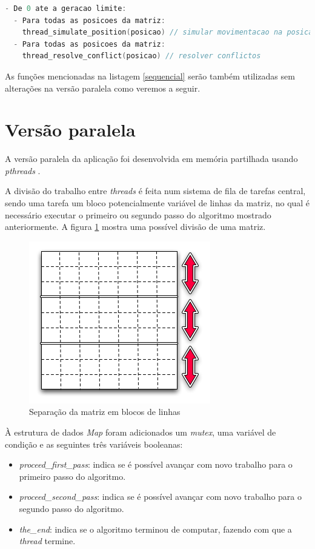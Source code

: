 \documentclass[12pt]{article}
\begin{document}
\begin{lstlisting}[language=c,frame=single,basicstyle=\footnotesize,caption={Algoritmo da versão sequencial.},label=sequencial]
- De 0 ate a geracao limite:
  - Para todas as posicoes da matriz:
    thread_simulate_position(posicao) // simular movimentacao na posicao
  - Para todas as posicoes da matriz:
    thread_resolve_conflict(posicao) // resolver conflictos
\end{lstlisting}

As funções mencionadas na listagem \ref{sequencial} serão também utilizadas sem alterações na versão
paralela como veremos a seguir.

\section{Versão paralela}

A versão paralela da aplicação foi desenvolvida em memória partilhada usando \textit{pthreads} \cite{pthreads}.

A divisão do trabalho entre \textit{threads} é feita num sistema de fila de tarefas central, sendo
uma tarefa um bloco potencialmente variável de linhas da matriz, no qual é necessário executar o primeiro
ou segundo passo do algoritmo mostrado anteriormente. A figura \ref{fig:tasks_matriz}
mostra uma possível divisão de uma matriz.

\begin{figure}[ht]
  \centering
    \includegraphics[scale=0.8]{diagrama_pipeline.png}
  \caption{Separação da matriz em blocos de linhas}
  \label{fig:tasks_matriz}
\end{figure}

À estrutura de dados \textit{Map} foram adicionados um \textit{mutex}, uma variável de condição
e as seguintes três variáveis booleanas:

\begin{itemize}
  \item \textit{proceed\_first\_pass}: indica se é possível avançar com novo trabalho
  para o primeiro passo do algoritmo.
  \item \textit{proceed\_second\_pass}: indica se é possível avançar com novo trabalho
  para o segundo passo do algoritmo.
  \item \textit{the\_end}: indica se o algoritmo terminou de computar, fazendo com que a \textit{thread} termine.
\end{itemize}
\end{document}
